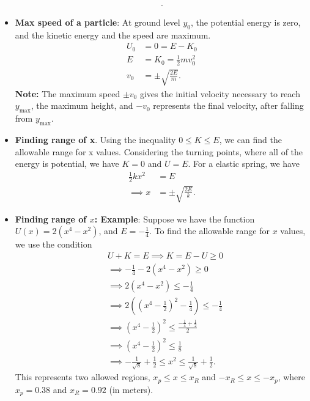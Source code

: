 \documentclass{report}
\begin{document}
\begin{itemize}
\begin{align*}
        .\end{align*}
    \item \textbf{Max speed of a particle}: At ground level $y_{0}$, the potential energy is zero, and the kinetic energy and the speed are maximum.
        \begin{align*}
            U_{0} &= 0 = E -K_{0} \\
            E&=K_{0}=\frac{1}{2}mv_{0}^{2} \\
            v_{0} &= \pm \sqrt{\frac{2E}{m}}
        .\end{align*}
        \bigbreak \noindent 
        \textbf{Note:} The maximum speed  $\pm v_{0}$ gives the initial velocity necessary to reach  $y_{\text{max}}$, the maximum height, and  $-v_{0}$ represents the final velocity, after falling from $y_{\text{max}}$.
    \item \textbf{Finding range of x}. Using the inequality $0 \leq K \leq E $, we can find the allowable range for x values. Considering the turning points, where all of the energy is potential, we have $K=0$ and $U=E$. For a elastic spring, we have
        \begin{align*}
            \frac{1}{2}kx^{2} &= E \\
            \implies x &= \pm \sqrt{\frac{2E}{k}}
        .\end{align*}
    \item \textbf{Finding range of $x$: Example}: Suppose we have the function $U(x) = 2(x^{4} - x^{2})$, and $E=-\frac{1}{4}$. To find the allowable range for $x$ values, we use the condition
        \begin{align*}
            &U+K = E \implies K = E - U \geq 0 \\
            &\implies -\frac{1}{4} - 2(x^{4}-x^{2}) \geq 0  \\
            &\implies 2\left(x^{4}-x^{2}\right) \leq -\frac{1}{4} \\
            &\implies 2\left(\left(x^{4}-\frac{1}{2}\right)^{2} - \frac{1}{4}\right) \leq -\frac{1}{4} \\
            &\implies \left(x^{4}-\frac{1}{2}\right)^{2} \leq \frac{-\frac{1}{4} + \frac{1}{2}}{2} \\
            &\implies \left(x^{4}-\frac{1}{2}\right)^{2} \leq \frac{1}{8} \\
            &\implies -\frac{1}{\sqrt{8}} + \frac{1}{2} \leq x^{2} \leq \frac{1}{\sqrt{8}} + \frac{1}{2}
        .\end{align*}
        \bigbreak \noindent 
        This represents two allowed regions, \(x_p \leq x \leq x_R\) and \(-x_R \leq x \leq -x_p\), where \(x_p = 0.38\) and \(x_R = 0.92\) (in meters).

\end{itemize}
\end{document}
